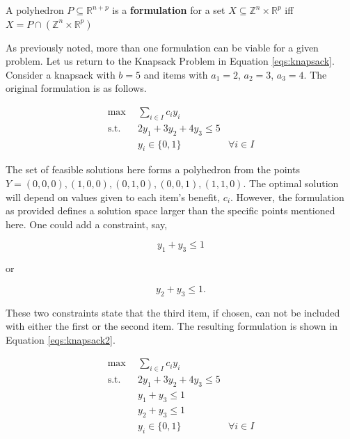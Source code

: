 \begin{define}\label{def:formulation}
A polyhedron $P \subseteq \mathbb{R}^{n+p}$ is a \textbf{formulation} for a set
$X \subseteq \mathbb{Z}^n \times \mathbb{R}^p$ iff $X = P \cap \left( 
\mathbb{Z}^n \times \mathbb{R}^p \right)$
\end{define}

As previously noted, more than one formulation can be viable for a given
problem. Let us return to the Knapsack Problem in
Equation \ref{eqs:knapsack}. Consider a knapsack with $b = 5$ and items with
$a_1 = 2$, $a_2 = 3$, $a_3 = 4$. The original formulation is as follows.

\begin{subequations}\label{eqs:knapsack1}
  \begin{align}
    \max \:\: & 
    \sum_{i \in I} c_i y_i
    & \\
    \text{s.t.} \:\: &
    2y_1 + 3y_2 + 4y_3 \leq 5 
    & \\
    &
    y_i \in \{ 0, 1 \}
    &
    \forall i \in I
  \end{align}
\end{subequations}

The set of feasible solutions here forms a polyhedron from the points $Y = {(0,
0, 0), (1, 0, 0), (0, 1, 0), (0, 0, 1), (1, 1, 0)}$. The optimal solution will
depend on values given to each item's benefit, $c_i$. However, the formulation
as provided defines a solution space larger than the specific points mentioned
here. One could add a constraint, say, 

\begin{equation}
y_1 + y_3 \leq 1
\end{equation}

or 

\begin{equation}
y_2 + y_3 \leq 1.
\end{equation}

These two constraints state that the third item, if chosen, can not be included
with either the first or the second item. The resulting formulation is shown in
Equation \ref{eqs:knapsack2}.

\begin{subequations}\label{eqs:knapsack2}
  \begin{align}
    \max \:\: & 
    \sum_{i \in I} c_i y_i
    & \\
    \text{s.t.} \:\: &
    2y_1 + 3y_2 + 4y_3 \leq 5 
    & \\
    &
    y_1 + y_3 \leq 1        
    & \\
    &
    y_2 + y_3 \leq 1        
    & \\
    &
    y_i \in \{ 0, 1 \}
    &
    \forall i \in I
  \end{align}
\end{subequations}

